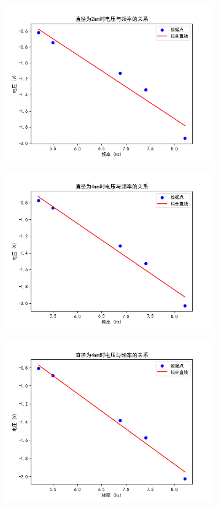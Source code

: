 \documentclass[signature=data]{physicsreport}
\begin{document}
\begin{figure}[H]
    \centering
    \includegraphics[width=0.8\textwidth]{images/lab13/Figure_1.png}
\end{figure}

\begin{figure}[H]
    \centering
    \includegraphics[width=0.8\textwidth]{images/lab13/Figure_2.png}
\end{figure}

\begin{figure}[H]
    \centering
    \includegraphics[width=0.8\textwidth]{images/lab13/Figure_3.png}
\end{figure}
\end{document}
